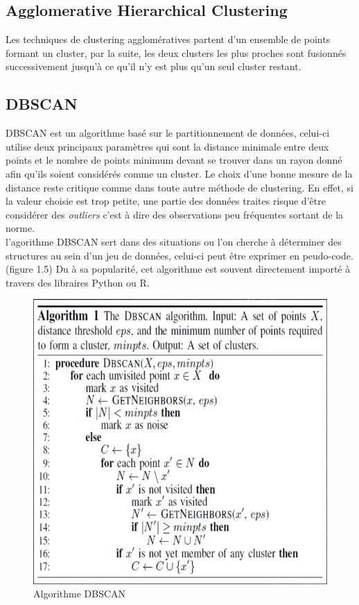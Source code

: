 \documentclass[memoire.tex]{subfiles}
\begin{document}
\subsection{Agglomerative Hierarchical Clustering}

Les techniques de clustering agglomératives partent d'un ensemble de points formant un cluster, par la suite, les deux clusters les plus proches sont fusionnés successivement jusqu'à ce qu'il n'y est plus qu'un seul cluster restant. \cite{ref4}
\newpage
\subsection{DBSCAN}
DBSCAN est un algorithme basé sur le partitionnement de données, celui-ci utilise deux principaux paramètres qui sont la distance minimale entre deux points et le nombre de points minimum devant se trouver dans un rayon donné afin qu'ils soient considérés comme un cluster\cite{ref12}. Le choix d'une bonne mesure de la distance reste critique comme dans toute autre méthode de clustering. En effet, si la valeur choisie est trop petite, une partie des données traites risque d'être considérer des \textit {outliers} c'est à dire des observations peu fréquentes sortant de la norme.\\
l'agorithme DBSCAN sert dans des situations ou l'on cherche à déterminer des structures au sein d'un jeu de données, celui-ci peut être exprimer en peudo-code.(figure 1.5) Du à sa popularité, cet algorithme est souvent directement importé à travers des libraires Python ou R.
	\begin{figure}[h!]
		\centerline{\includegraphics[scale=0.8]{img/dbscan.png}}
		\caption{Algorithme DBSCAN}
	\end{figure}
\end{document}
